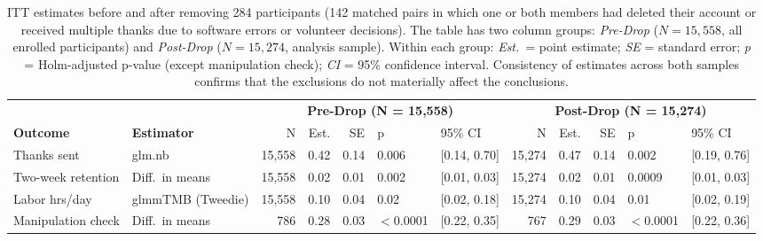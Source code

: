 \begin{table}[ht]
\centering
\small
\caption{ITT estimates before and after removing 284 participants (142 matched pairs in which one or both members had deleted their account or received multiple thanks due to software errors or volunteer decisions). The table has two column groups: \textit{Pre-Drop} ($N = 15{,}558$, all enrolled participants) and \textit{Post-Drop} ($N = 15{,}274$, analysis sample). Within each group: \textit{Est.}\ = point estimate; \textit{SE} = standard error; \textit{p} = Holm-adjusted p-value (except manipulation check); \textit{CI} = 95\% confidence interval. Consistency of estimates across both samples confirms that the exclusions do not materially affect the conclusions.}
\label{table:predrop_results}
\begin{tabular}{llrrrllrrrll}
\toprule
 & & \multicolumn{5}{c}{\textbf{Pre-Drop (N = 15,558)}} & \multicolumn{5}{c}{\textbf{Post-Drop (N = 15,274)}} \\
\cmidrule(lr){3-7} \cmidrule(lr){8-12}
\textbf{Outcome} & \textbf{Estimator} & N & Est. & SE & p & 95\% CI & N & Est. & SE & p & 95\% CI \\
\midrule
Thanks sent & glm.nb & 15,558 & 0.42 & 0.14 & 0.006 & [0.14, 0.70] & 15,274 & 0.47 & 0.14 & 0.002 & [0.19, 0.76] \\
Two-week retention & Diff.\ in means & 15,558 & 0.02 & 0.01 & 0.002 & [0.01, 0.03] & 15,274 & 0.02 & 0.01 & 0.0009 & [0.01, 0.03] \\
Labor hrs/day & glmmTMB (Tweedie) & 15,558 & 0.10 & 0.04 & 0.02 & [0.02, 0.18] & 15,274 & 0.10 & 0.04 & 0.01 & [0.02, 0.19] \\
\addlinespace
Manipulation check & Diff.\ in means & 786 & 0.28 & 0.03 & $<$0.0001 & [0.22, 0.35] & 767 & 0.29 & 0.03 & $<$0.0001 & [0.22, 0.36] \\
\bottomrule
\end{tabular}
\end{table}
